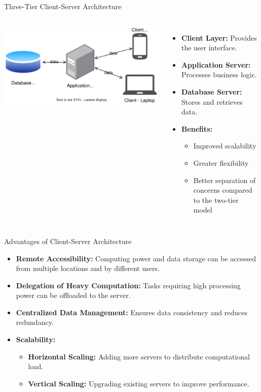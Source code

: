 \documentclass[aspectratio=169, table]{beamer}
\begin{document}
\begin{frame}{Three-Tier Client-Server Architecture}
	\vspace{20pt}
	\begin{columns}
		\includegraphics[width=\textwidth]{client-server-3-tier}
		\label{fig:client-server-schema}
		
		\begin{itemize}
			\item \textbf{Client Layer:} Provides the user interface.
			\item \textbf{Application Server:} Processes business logic.
			\item \textbf{Database Server:} Stores and retrieves data.
			\item \textbf{Benefits:} 
			\begin{itemize}
				\item Improved scalability
				\item Greater flexibility
				\item Better separation of concerns compared to the two-tier model
			\end{itemize}
		\end{itemize}
	\end{columns}
\end{frame}


\begin{frame}{Advantages of Client-Server Architecture}
	\begin{itemize}
		\item \textbf{Remote Accessibility:} Computing power and data storage can be accessed from multiple locations and by different users.
		\item \textbf{Delegation of Heavy Computation:} Tasks requiring high processing power can be offloaded to the server.
		\item \textbf{Centralized Data Management:} Ensures data consistency and reduces redundancy.
		\item \textbf{Scalability:}
		\begin{itemize}
			\item \textbf{Horizontal Scaling:} Adding more servers to distribute computational load.
			\item \textbf{Vertical Scaling:} Upgrading existing servers to improve performance.
		\end{itemize}
	\end{itemize}
\end{frame}
\end{document}
